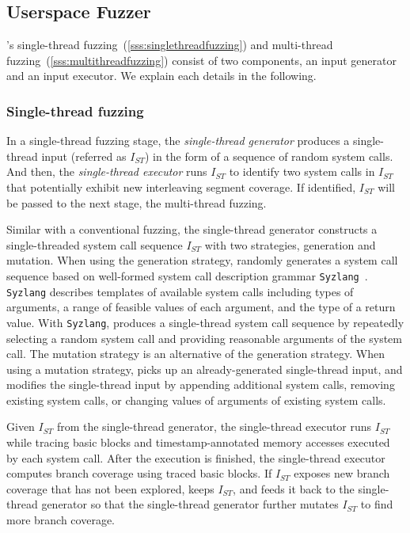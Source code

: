 \subsection{Userspace Fuzzer}
\label{ss:fuzzer}

\sys's single-thread fuzzing~(\autoref{sss:singlethreadfuzzing}) and
multi-thread fuzzing~(\autoref{sss:multithreadfuzzing}) consist of two
components, an input generator and an input executor. We explain
each details in the following.


\subsubsection{Single-thread fuzzing}
\label{sss:singlethreadfuzzing}
%
In a single-thread fuzzing stage, the \textit{single-thread generator}
produces a single-thread input (referred as $I_{ST}$) in the form of a
sequence of random system calls.
%
And then, the \textit{single-thread executor} runs $I_{ST}$ to
identify two system calls in $I_{ST}$ that potentially exhibit new
interleaving segment coverage.  If identified, $I_{ST}$ will be passed
to the next stage, the multi-thread fuzzing.


%
Similar with a conventional fuzzing, the single-thread generator
constructs a single-threaded system call sequence $I_{ST}$ with two
strategies, generation and mutation.
%
When using the generation strategy, \sys randomly generates a system
call sequence based on well-formed system call description grammar
\texttt{Syzlang}~\cite{syzlang}.
%
\texttt{Syzlang} describes templates of available system calls
including types of arguments, a range of feasible values of each
argument, and the type of a return value.
%
With \texttt{Syzlang}, \sys produces a single-thread system call
sequence by repeatedly selecting a random system call and providing
reasonable arguments of the system call.
%
The mutation strategy is an alternative of the generation strategy.
When using a mutation strategy, \sys picks up an already-generated
single-thread input, and modifies the single-thread input by appending
additional system calls, removing existing system calls, or changing
values of arguments of existing system calls.


%
Given $I_{ST}$ from the single-thread generator, the single-thread
executor runs $I_{ST}$ while tracing basic blocks and
timestamp-annotated memory accesses executed by each system call.
%
After the execution is finished, the single-thread executor computes
branch coverage using traced basic blocks.
%
If $I_{ST}$ exposes new branch coverage that has not been explored,
\sys keeps $I_{ST}$, and feeds it back to the single-thread generator
so that the single-thread generator further mutates $I_{ST}$ to find
more branch coverage.


